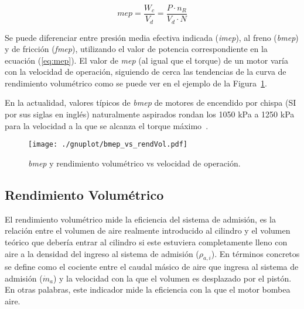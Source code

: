 \begin{equation}\label{eq:mep}
  mep = \frac{W_{c}}{V_d} = \frac{P \cdot n_R}{V_d \cdot N}
\end{equation}
%

Se puede diferenciar entre presión media efectiva indicada (\emph{imep}), al
freno (\emph{bmep}) y de fricción (\emph{fmep}), utilizando el valor de potencia
correspondiente en la ecuación (\ref{eq:mep}).
%
El valor de \emph{mep} (al igual que el torque) de un motor varía con la
velocidad de operación, siguiendo de cerca las tendencias de la curva de
rendimiento volumétrico como se puede ver en el ejemplo de la
Figura~\ref{fig:bmep_tipica}.

En la actualidad, valores típicos de \emph{bmep} de motores de encendido por
chispa (SI por sus siglas en inglés) naturalmente aspirados rondan los 1050 kPa
a 1250 kPa para la velocidad a la que se alcanza el torque máximo~\parencite{heywood}.

\begin{figure} \centering
\texttt{[image: ./gnuplot/bmep\_vs\_rendVol.pdf]}
    \caption{\emph{bmep} y rendimiento volumétrico vs velocidad de operación.}
    \label{fig:bmep_tipica}
\end{figure}



\subsection{Rendimiento Volumétrico}
%
El rendimiento volumétrico mide la eficiencia del sistema de admisión, es la
relación entre el volumen de aire realmente introducido al cilindro y el volumen
teórico que debería entrar al cilindro si este estuviera completamente lleno con
aire a la densidad del ingreso al sistema de admisión ($\rho_{a,i}$).
%
En términos concretos se define como el cociente entre el caudal másico de aire
que ingresa al sistema de admisión ($\dot{m}_{a}$) y la velocidad con la que el
volumen es desplazado por el pistón.
%
En otras palabras, este indicador mide la eficiencia con la que el motor bombea
aire.

